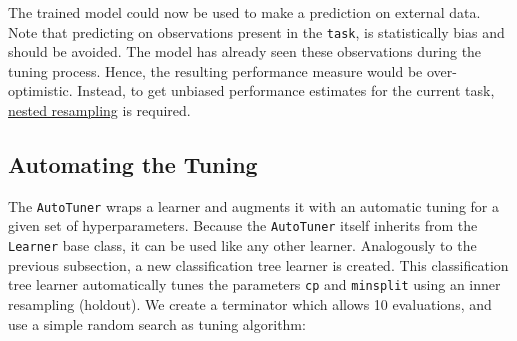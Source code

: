 \documentclass[
  11pt,
  parskip=half,
  DIV=calc,
  BCOR=10mm,
  x11names]{scrbook}
\newenvironment{Shaded}{}{}
\newcommand{\KeywordTok}[1]{\textcolor[rgb]{0.00,0.00,1.00}{#1}}
\newcommand{\NormalTok}[1]{#1}
\newcommand{\OperatorTok}[1]{#1}
\newcommand{\StringTok}[1]{\textcolor[rgb]{0.00,0.50,0.50}{#1}}
\begin{document}
\begin{Shaded}
\end{Shaded}

The trained model could now be used to make a prediction on external data.
Note that predicting on observations present in the \texttt{task}, is statistically bias and should be avoided.
The model has already seen these observations during the tuning process.
Hence, the resulting performance measure would be over-optimistic.
Instead, to get unbiased performance estimates for the current task, \protect\hyperlink{nested-resamling}{nested resampling} is required.

\hypertarget{autotuner}{%
\subsection{Automating the Tuning}\label{autotuner}}

The \texttt{AutoTuner} wraps a learner and augments it with an automatic tuning for a given set of hyperparameters.
Because the \texttt{AutoTuner} itself inherits from the \texttt{Learner} base class, it can be used like any other learner.
Analogously to the previous subsection, a new classification tree learner is created.
This classification tree learner automatically tunes the parameters \texttt{cp} and \texttt{minsplit} using an inner resampling (holdout).
We create a terminator which allows 10 evaluations, and use a simple random search as tuning algorithm:
\end{document}
